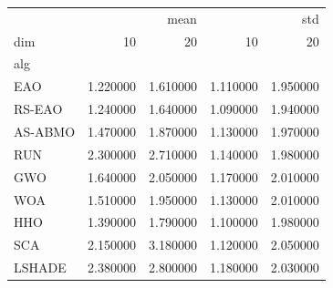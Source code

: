 \begin{tabular}{lrrrr}
\toprule
 & \multicolumn{2}{r}{mean} & \multicolumn{2}{r}{std} \\
dim & 10 & 20 & 10 & 20 \\
alg &  &  &  &  \\
\midrule
EAO & 1.220000 & 1.610000 & 1.110000 & 1.950000 \\
RS-EAO & 1.240000 & 1.640000 & 1.090000 & 1.940000 \\
AS-ABMO & 1.470000 & 1.870000 & 1.130000 & 1.970000 \\
RUN & 2.300000 & 2.710000 & 1.140000 & 1.980000 \\
GWO & 1.640000 & 2.050000 & 1.170000 & 2.010000 \\
WOA & 1.510000 & 1.950000 & 1.130000 & 2.010000 \\
HHO & 1.390000 & 1.790000 & 1.100000 & 1.980000 \\
SCA & 2.150000 & 3.180000 & 1.120000 & 2.050000 \\
LSHADE & 2.380000 & 2.800000 & 1.180000 & 2.030000 \\
\bottomrule
\end{tabular}
